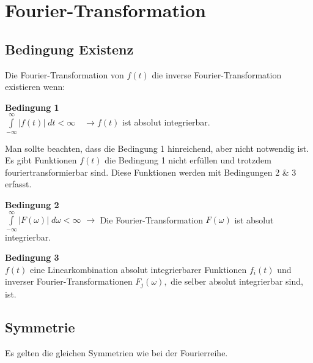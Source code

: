 
\section{Fourier-Transformation}%
	\subsection{Bedingung Existenz}%
		\vspace{-3mm}	%
		Die Fourier-Transformation von $f(t)$
		die inverse Fourier-Transformation existieren  wenn:
		
		\textbf{Bedingung 1}\\
			$\int\limits_{-\infty}^{\infty}|f(t)| \; d t<\infty \quad \rightarrow f(t)$ ist absolut integrierbar.
			
		Man sollte beachten, dass die Bedingung 1 hinreichend, aber nicht notwendig ist. Es gibt Funktionen $f(t)$ die Bedingung 1 nicht erfüllen und trotzdem fouriertransformierbar sind. Diese Funktionen werden mit Bedingungen 2 \& 3 erfasst. 
		
		\textbf{Bedingung 2}\\
			$\int\limits_{-\infty}^{\infty}|F(\omega)| \; d \omega<\infty$ \quad
			$\rightarrow$ Die Fourier-Transformation $F( \omega)$ ist absolut integrierbar.
			
		\textbf{Bedingung 3}\\
			$f(t)$ eine Linearkombination absolut integrierbarer Funktionen
			$f_{i}(t)$ und inverser Fourier-Transformationen $F_{j}(\omega),$ die selber
			absolut integrierbar sind, ist.
			
	\subsection{Symmetrie}%
		\vspace{-3mm}	%
		Es gelten die gleichen Symmetrien wie bei der Fourierreihe.

